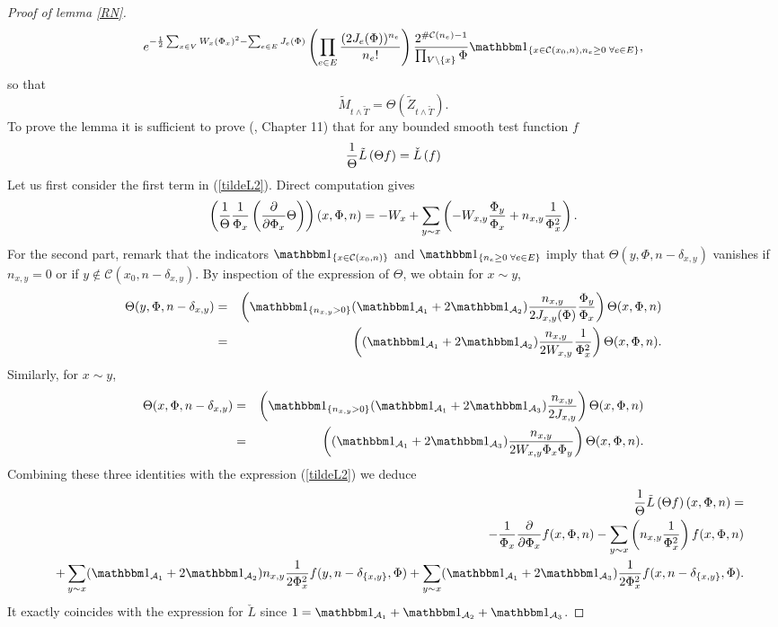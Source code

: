 \documentclass[11pt,a4paper]{amsart}
\numberwithin{equation}{section}
\def\ccc{{\mathcal C}}
\def\demi{{1\over 2}}
\def\aaa{\mathcal{A}}
\def\indic{{{\mathbbm 1}}}
\begin{document}
\begin{proof}[Proof of lemma \ref{RN}]
\begin{multline}
e^{-\demi \sum_{x\in V}W_x (\Phi_x)^2-\sum_{e\in E} J_e(\Phi) }
\left(\prod_{e\in E} {(2J_e(\Phi))^{n_e}\over n_e !}\right)
{2^{\#\ccc(n_e)-1}
\over \prod_{V\setminus\{x\}} \Phi }\indic_{\{x\in \ccc(x_0,n),
n_e\ge 0\; \forall e\in E\}},
\end{multline}
so that
$$
\tilde M_{t\wedge \tilde T}= \Theta(\tilde Z_{t\wedge\tilde T}).
$$
To prove the lemma it is sufficient to prove (\cite{ChungWalsh05MP}, Chapter 11) that for any bounded smooth test function $f$
\begin{eqnarray}\label{LcheckL}
{1\over \Theta}\tilde L\left(\Theta f\right)= \check L\left(f\right)
 \end{eqnarray}
Let us first consider the first term in (\ref{tildeL2}).
Direct computation gives 
$$
\left({1\over \Theta}{1\over \Phi_x}\left({\partial\over\partial \Phi_x} \Theta\right)\right) (x,\Phi,n)= -W_x+\sum_{y\sim x} \left(- W_{x,y}{\Phi_y\over\Phi_x}+n_{x,y}{1\over \Phi_x^2}\right).
$$
For the second part, remark that the indicators $\indic_{\{x\in \ccc(x_0,n)\}}$ and $\indic_{\{n_e\ge 0\; \forall e\in E\}}$ imply that 
$
\Theta(y,\Phi, n-\delta_{x,y})
$
vanishes if $n_{x,y}=0$ or if $y\not\in \ccc(x_0,n-\delta_{x,y})$.
By inspection of the expression of $\Theta$, we obtain for $x\sim y$,
\begin{eqnarray*}
\Theta (y,\Phi, n-\delta_{x,y})&=& \left(\indic_{\{n_{x,y}>0\}} (\indic_{\aaa_1}+2\indic_{\aaa_2}) {n_{x,y}\over 2J_{x,y}(\Phi)}{\Phi_y\over \Phi_x}\right)\Theta(x,\Phi, n) 
\\
&=&\left((\indic_{\aaa_1}+2\indic_{\aaa_2}) {n_{x,y}\over 2W_{x,y}}{1\over \Phi_x^2}\right)\Theta(x,\Phi, n).
\end{eqnarray*}
Similarly,  for $x\sim y$,
\begin{eqnarray*}
\Theta(x,\Phi, n-\delta_{x,y})&=& \left(\indic_{\{n_{x,y}>0\}}(\indic_{\aaa_1}+2\indic_{\aaa_3}){n_{x,y}\over 2J_{x,y}}\right)\Theta(x,\Phi, n)\\
&=&
\left((\indic_{\aaa_1}+2\indic_{\aaa_3}) {n_{x,y}\over 2W_{x,y}\Phi_x\Phi_y}\right)\Theta(x,\Phi, n).
\end{eqnarray*}
Combining these three identities with the expression (\ref{tildeL2}) we deduce
\begin{eqnarray*}
&&{1\over \Theta}\tilde L\left(\Theta f\right)(x,\Phi,n)=\\
&&
-{1\over \Phi_x} {\partial\over\partial \Phi_x}f(x,\Phi,n)-\sum_{y\sim x} \left(n_{x,y}{1\over \Phi_x^2}\right)f(x,\Phi,n)
\\
&&  +\sum_{y\sim x} (\indic_{\aaa_1}+2\indic_{\aaa_2}) n_{x,y}{1\over 2\Phi_x^2} f(y,  n-\delta_{\{x,y\}},\Phi)+
\sum_{y\sim x}(\indic_{\aaa_1}+2\indic_{\aaa_3}){1\over 2 \Phi_x^2} f(x, n-\delta_{\{x,y\}},\Phi).
\end{eqnarray*}
It exactly coincides with the expression for $\check L$ since $1=\indic_{\aaa_1}+\indic_{\aaa_2}+\indic_{\aaa_3}$.
\end{proof}
\end{document}
